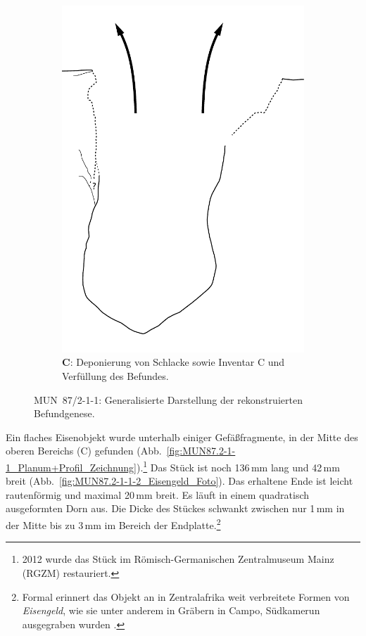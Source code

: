 \begin{figure}[!tb]
\begin{subfigure}[t]{0.32\textwidth}
		\includegraphics[width = \textwidth, page = 6]{fig/MUN87-211_Ablauf.pdf}
		\caption{\textbf{C}: Deponierung von Schlacke sowie Inventar C und Verfüllung des Befundes.}
		\label{fig:MUN87.2-1-1_Sequenz_Skizze_06}
	\end{subfigure}
	\caption{MUN~87/2-1-1: Generalisierte Darstellung der rekonstruierten Befundgenese.}
	\label{fig:MUN87.2-1-1_Sequenz_Skizze}
\end{figure}

Ein flaches Eisenobjekt wurde unterhalb einiger Gefäßfragmente, in der Mitte des oberen Bereichs (C) gefunden (Abb.~\ref{fig:MUN87.2-1-1_Planum+Profil_Zeichnung}).\footnote{2012 wurde das Stück im Römisch-Germanischen Zentralmuseum Mainz (RGZM) restauriert.} Das Stück ist noch 136\,mm lang und 42\,mm breit (Abb.~\ref{fig:MUN87.2-1-1-2_Eisengeld_Foto}). Das erhaltene Ende ist leicht rautenförmig und maximal 20\,mm breit. Es läuft in einem quadratisch ausgeformten Dorn aus. Die Dicke des Stückes schwankt zwischen nur 1\,mm in der Mitte bis zu 3\,mm im Bereich der Endplatte.\footnote{Formal erinnert das Objekt an in Zentralafrika weit verbreitete Formen von \textit{Eisengeld}, wie sie unter anderem in Gräbern in Campo, Südkamerun ausgegraben wurden \parencite[siehe][119 Abb.~6.17, 122, 138, 194.1--2, 208.1--2]{Eggert.2016}.}

